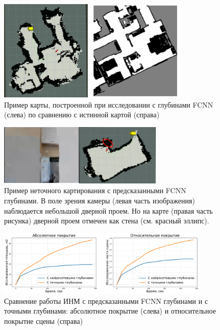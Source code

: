 \documentclass{mipt-thesis-ms}
\begin{document}
	\begin{figure}
		\centering
		\includegraphics[width=0.8\textwidth]{img/fcnn_map_example.png}
		\caption{Пример карты, построенной при исследовании с глубинами FCNN (слева) по сравнению с истинной картой (справа) }
		\label{figure_fcnn_map_example}
	\end{figure}
	
	\begin{figure}
		\centering
		\includegraphics[width=0.7\textwidth]{img/camera_view.png}
		\caption{Пример неточного картирования с предсказанными FCNN глубинами. В поле зрения камеры (левая часть изображения) наблюдается небольшой дверной проем. Но на карте (правая часть рисунка) дверной проем отмечен как стена (см. красный эллипс). }
		\label{figure_doorway_ignore}
	\end{figure}
	
	\begin{figure}
		\centering
		\includegraphics[width=0.9\textwidth]{img/test_fcnn_rus.png}
		\caption{Сравнение работы ИНМ с предсказанными FCNN глубинами и с точными глубинами: абсолютное покрытие (слева) и относительное покрытие сцены (справа) }
		\label{figure_fcnn_metrics}
	\end{figure}
	
\end{document}
